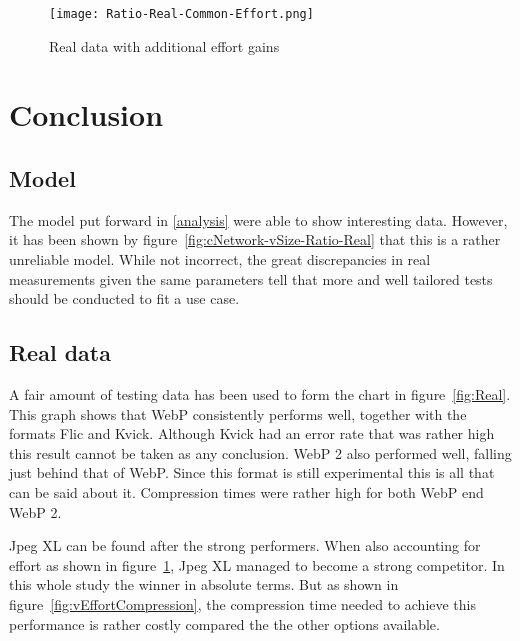 \documentclass[11pt,a4paper]{report}
\begin{document}

\begin{figure}[!htb]
\centering
\texttt{[image: Ratio-Real-Common-Effort.png]}
\caption{\label{fig:vEffortReal} Real data with additional effort gains}
\end{figure}

\newpage

\chapter{Conclusion}


\section{Model}

The model put forward in \ref{analysis} were able to show interesting data. However, it has been shown by figure~\ref{fig:cNetwork-vSize-Ratio-Real} that this is a rather unreliable model. While not incorrect, the great discrepancies in real measurements given the same parameters tell that more and well tailored tests should be conducted to fit a use case.

\section{Real data}

A fair amount of testing data has been used to form the chart in figure~\ref{fig:Real}. This graph shows that WebP consistently performs well, together with the formats Flic and Kvick. Although Kvick had an error rate that was rather high this result cannot be taken as any conclusion. WebP 2 also performed well, falling just behind that of WebP. Since this format is still experimental this is all that can be said about it. Compression times were rather high for both WebP end WebP 2.

Jpeg XL can be found after the strong performers. When also accounting for effort as shown in figure~\ref{fig:vEffortReal}, Jpeg XL managed to become a strong competitor. In this whole study the winner in absolute terms. But as shown in figure~\ref{fig:vEffortCompression}, the compression time needed to achieve this performance is rather costly compared the the other options available.
\end{document}
